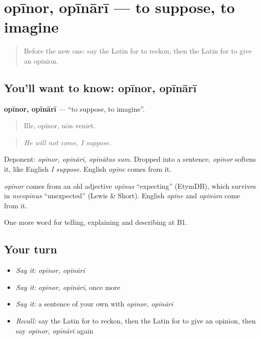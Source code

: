 \section[opīnor, opīnārī]{opīnor, opīnārī — to suppose, to imagine}

\label{lesson:LA-C357-opinor}



\begin{quote}
Before the new one: say the Latin for to reckon, then the Latin for to give an opinion.
\end{quote}

\subsection*{You'll want to know: opīnor, opīnārī}
\textbf{opīnor, opīnārī} — \textquotedblleft{}to suppose, to imagine\textquotedblright{}.

\begin{quote}
Ille, opīnor, nōn veniet.
\end{quote}

\begin{quote}
\emph{He will not come, I suppose.}
\end{quote}

Deponent: \emph{opīnor, opīnārī, opīnātus sum}. Dropped into a sentence, \emph{opīnor} softens it, like English \emph{I suppose}. English \emph{opine} comes from it.

\begin{cousinweb}
\emph{opīnor} comes from an old adjective \emph{opīnus} \textquotedblleft{}expecting\textquotedblright{} (EtymDB), which survives in \emph{necopīnus} \textquotedblleft{}unexpected\textquotedblright{} (Lewis \& Short). English \emph{opine} and \emph{opinion} come from it.
\end{cousinweb}

\begin{grammarlens}[title={What you've built}]
One more word for telling, explaining and describing at B1.
\end{grammarlens}

\subsection*{Your turn}
\begin{itemize}
\raggedright
  \item \emph{Say it:} \emph{opīnor, opīnārī}
  \item \emph{Say it:} \emph{opīnor, opīnārī}, once more
  \item \emph{Say it:} a sentence of your own with \emph{opīnor, opīnārī}
  \item \emph{Recall:} say the Latin for to reckon, then the Latin for to give an opinion, then say \emph{opīnor, opīnārī} again
\end{itemize}

